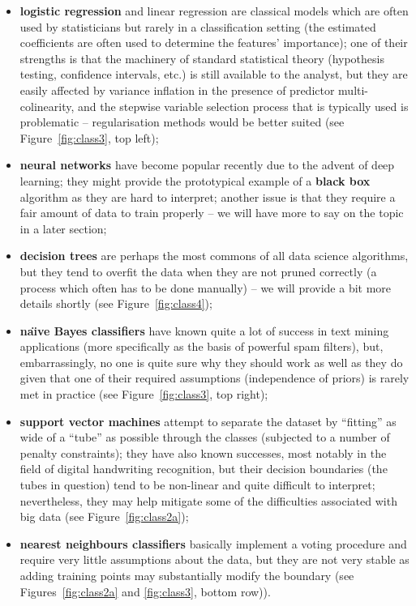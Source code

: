 \afterpage{\FloatBarrier}
\begin{itemize}[noitemsep]
\item \textbf{logistic regression} and linear regression are classical models which are often used by statisticians but rarely in a classification setting (the estimated coefficients are often used to determine the features' importance); one of their strengths is that the machinery of standard statistical theory (hypothesis testing, confidence intervals, etc.) is still available to the analyst, but they are easily affected by variance inflation in the presence of predictor multi-colinearity, and the stepwise variable selection process that is typically used is problematic -- regularisation methods would be better suited \cite{DSML_LASSO} (see Figure~\ref{fig:class3}, top left);
\item \textbf{neural networks} have become popular recently due to the advent of deep learning; they might provide the prototypical example of a \textbf{black box} algorithm as they are hard to interpret; another issue is that they require a fair amount of data to train properly -- we will have more to say on the topic in a later section; 
\item \textbf{decision trees} are perhaps the most commons of all data science algorithms, but they tend to overfit the data when they are not pruned correctly (a process which often has to be done manually) -- we will provide a bit more details shortly (see Figure~\ref{fig:class4}); 
\item \textbf{na\"{\i}ve Bayes classifiers} have known quite a lot of success in text mining applications (more specifically as the basis of powerful spam filters), but, embarrassingly, no one is quite sure why they should work as well as they do given that one of their required assumptions (independence of priors) is rarely met in practice (see Figure~\ref{fig:class3}, top right);
\item \textbf{support vector machines} attempt to separate the dataset by ``fitting'' as wide of a ``tube'' as possible through the classes (subjected to a number of penalty constraints); they have also known successes, most notably in the field of digital handwriting recognition, but their decision boundaries (the tubes in question) tend to be non-linear and quite difficult to interpret; nevertheless, they may help mitigate some of the difficulties associated with big data (see Figure~\ref{fig:class2a});
\item \textbf{nearest neighbours classifiers} basically implement a voting procedure and  require very little assumptions about the data, but they are not very stable as adding training points may substantially modify the boundary (see Figures~\ref{fig:class2a} and \ref{fig:class3}, bottom row)).
\end{itemize}
